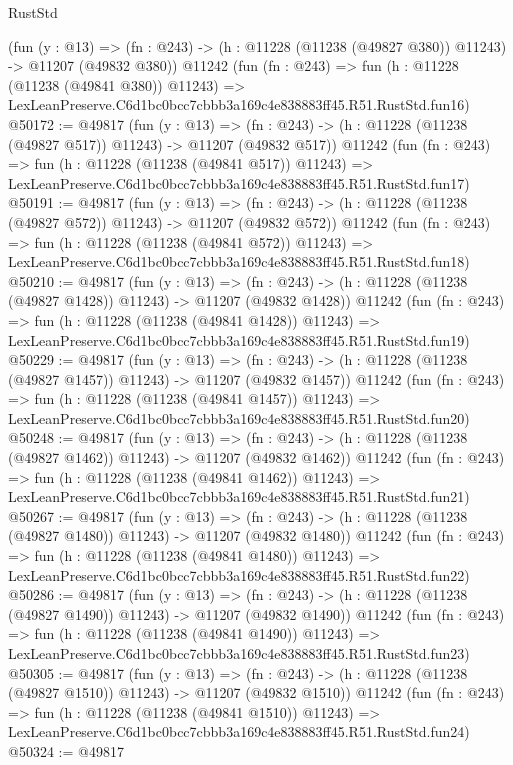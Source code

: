 \begin{lexlean}{RustStd}
\begin{coremodule}
    (fun (y : @13) =>
    (fn : @243) -> (h : @11228 (@11238 (@49827 @380)) @11243) -> @11207 (@49832 @380))
    @11242
    (fun (fn : @243) =>
    fun (h : @11228 (@11238 (@49841 @380)) @11243) =>
    LexLeanPreserve.C6d1bc0bcc7cbbb3a169c4e838883ff45.R51.RustStd.fun16)
@50172 := @49817
    (fun (y : @13) =>
    (fn : @243) -> (h : @11228 (@11238 (@49827 @517)) @11243) -> @11207 (@49832 @517))
    @11242
    (fun (fn : @243) =>
    fun (h : @11228 (@11238 (@49841 @517)) @11243) =>
    LexLeanPreserve.C6d1bc0bcc7cbbb3a169c4e838883ff45.R51.RustStd.fun17)
@50191 := @49817
    (fun (y : @13) =>
    (fn : @243) -> (h : @11228 (@11238 (@49827 @572)) @11243) -> @11207 (@49832 @572))
    @11242
    (fun (fn : @243) =>
    fun (h : @11228 (@11238 (@49841 @572)) @11243) =>
    LexLeanPreserve.C6d1bc0bcc7cbbb3a169c4e838883ff45.R51.RustStd.fun18)
@50210 := @49817
    (fun (y : @13) =>
    (fn : @243) -> (h : @11228 (@11238 (@49827 @1428)) @11243) -> @11207 (@49832 @1428))
    @11242
    (fun (fn : @243) =>
    fun (h : @11228 (@11238 (@49841 @1428)) @11243) =>
    LexLeanPreserve.C6d1bc0bcc7cbbb3a169c4e838883ff45.R51.RustStd.fun19)
@50229 := @49817
    (fun (y : @13) =>
    (fn : @243) -> (h : @11228 (@11238 (@49827 @1457)) @11243) -> @11207 (@49832 @1457))
    @11242
    (fun (fn : @243) =>
    fun (h : @11228 (@11238 (@49841 @1457)) @11243) =>
    LexLeanPreserve.C6d1bc0bcc7cbbb3a169c4e838883ff45.R51.RustStd.fun20)
@50248 := @49817
    (fun (y : @13) =>
    (fn : @243) -> (h : @11228 (@11238 (@49827 @1462)) @11243) -> @11207 (@49832 @1462))
    @11242
    (fun (fn : @243) =>
    fun (h : @11228 (@11238 (@49841 @1462)) @11243) =>
    LexLeanPreserve.C6d1bc0bcc7cbbb3a169c4e838883ff45.R51.RustStd.fun21)
@50267 := @49817
    (fun (y : @13) =>
    (fn : @243) -> (h : @11228 (@11238 (@49827 @1480)) @11243) -> @11207 (@49832 @1480))
    @11242
    (fun (fn : @243) =>
    fun (h : @11228 (@11238 (@49841 @1480)) @11243) =>
    LexLeanPreserve.C6d1bc0bcc7cbbb3a169c4e838883ff45.R51.RustStd.fun22)
@50286 := @49817
    (fun (y : @13) =>
    (fn : @243) -> (h : @11228 (@11238 (@49827 @1490)) @11243) -> @11207 (@49832 @1490))
    @11242
    (fun (fn : @243) =>
    fun (h : @11228 (@11238 (@49841 @1490)) @11243) =>
    LexLeanPreserve.C6d1bc0bcc7cbbb3a169c4e838883ff45.R51.RustStd.fun23)
@50305 := @49817
    (fun (y : @13) =>
    (fn : @243) -> (h : @11228 (@11238 (@49827 @1510)) @11243) -> @11207 (@49832 @1510))
    @11242
    (fun (fn : @243) =>
    fun (h : @11228 (@11238 (@49841 @1510)) @11243) =>
    LexLeanPreserve.C6d1bc0bcc7cbbb3a169c4e838883ff45.R51.RustStd.fun24)
@50324 := @49817

\end{coremodule}
\end{lexlean}
